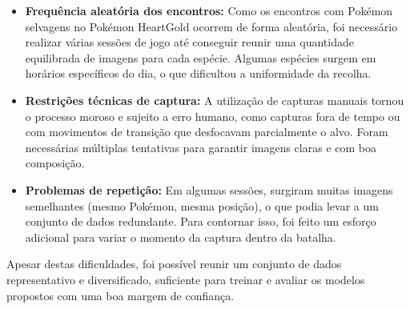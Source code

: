 \begin{itemize} 
    \item \textbf{Frequência aleatória dos encontros:} Como os encontros com Pokémon selvagens no Pokémon HeartGold ocorrem de forma aleatória, foi necessário realizar várias sessões de jogo até conseguir reunir uma quantidade equilibrada de imagens para cada espécie. Algumas espécies surgem em horários específicos do dia, o que dificultou a uniformidade da recolha.

    \item \textbf{Restrições técnicas de captura:} A utilização de capturas manuais tornou o processo moroso e sujeito a erro humano, como capturas fora de tempo ou com movimentos de transição que desfocavam parcialmente o alvo. Foram necessárias múltiplas tentativas para garantir imagens claras e com boa composição.

    \item \textbf{Problemas de repetição:} Em algumas sessões, surgiram muitas imagens semelhantes (mesmo Pokémon, mesma posição), o que podia levar a um conjunto de dados redundante. Para contornar isso, foi feito um esforço adicional para variar o momento da captura dentro da batalha.
\end{itemize}

Apesar destas dificuldades, foi possível reunir um conjunto de dados representativo e diversificado, suficiente para treinar e avaliar os modelos propostos com uma boa margem de confiança.